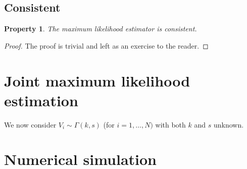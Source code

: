 \documentclass[final]{aomart}
\newtheorem[{}\it]{thm}{Theorem}[section]
\newtheorem{prop}[thm]{Property}
\theoremstyle{definition}
\newtheorem*[{}\it]{notation}{Notation}
\numberwithin{equation}{section}
\begin{document}
\subsection{Consistent}
\begin{prop}
	The maximum likelihood estimator is consistent.
\end{prop}
\begin{proof}
	The proof is trivial and left as an exercise to the reader.
\end{proof}
\section{Joint maximum likelihood estimation}
We now consider \(V_i \sim \Gamma(k, s)\) (for \(i = 1,\ldots,N)\) with both \(k\) and \(s\) unknown.
\section{Numerical simulation}
\end{document}
